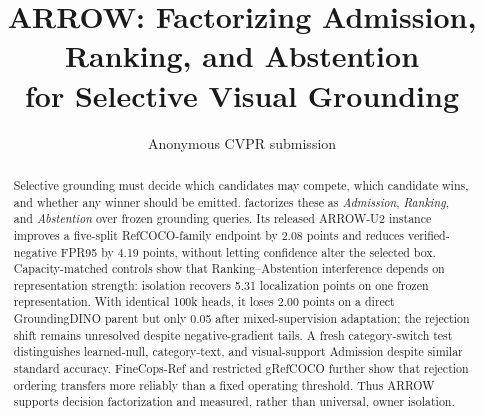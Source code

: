 \documentclass[10pt,twocolumn,letterpaper]{article}
\title{ARROW: Factorizing Admission, Ranking, and Abstention\\for Selective Visual Grounding}
\author{Anonymous CVPR submission}
\begin{document}
\maketitle

\begin{abstract}
Selective grounding must decide which candidates may compete, which candidate
wins, and whether any winner should be emitted.  \method factorizes these as
\emph{Admission}, \emph{Ranking}, and \emph{Abstention} over frozen grounding
queries.  Its released ARROW-U2 instance improves a five-split RefCOCO-family
endpoint by 2.08 points and reduces verified-negative FPR95 by 4.19 points,
without letting confidence alter the selected box.  Capacity-matched controls
show that Ranking--Abstention interference depends on representation strength:
isolation recovers 5.31 localization points on one frozen representation. With
identical 100k heads, it loses 2.00 points on a direct GroundingDINO parent but
only 0.05 after mixed-supervision adaptation; the rejection shift remains
unresolved despite negative-gradient tails.  A
fresh category-switch test distinguishes learned-null, category-text, and
visual-support Admission despite similar standard accuracy.  FineCops-Ref and
restricted gRefCOCO further show that rejection ordering transfers more
reliably than a fixed operating threshold.  Thus ARROW supports decision
factorization and measured, rather than universal, owner isolation.
\end{abstract}









\FloatBarrier

\label{paper:references-start}
{\small


}
\end{document}
